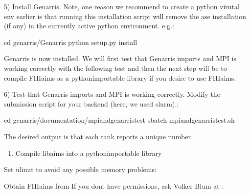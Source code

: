 \documentclass[letterpaper,10pt,english]{sphinxmanual}
\begin{document}
5) Install Genarris. Note, one reason we recommend to create a python virutal env earlier is that running this installation script will remove the ase installation (if any) in the currently active python environment.
e.g.:

\begin{sphinxVerbatim}[commandchars=\\\{\}]
cd \PYGZdl{}genarris/Genarris
python setup.py install
\end{sphinxVerbatim}

Genarris is now installed. We will first test that Genarris imports and MPI is working correctly with the following test and then the next step will be to compile FHI\sphinxhyphen{}aims as a python\sphinxhyphen{}importable library if you desire to use FHI\sphinxhyphen{}aims.

6) Test that Genarris imports and MPI is working correctly.
Modify the submission script for your backend (here, we used slurm).:

\begin{sphinxVerbatim}[commandchars=\\\{\}]
cd \PYGZdl{}genarris/documentation/mpi\PYGZus{}and\PYGZus{}genarris\PYGZus{}test
sbatch mpi\PYGZus{}and\PYGZus{}genarris\PYGZus{}test.sh
\end{sphinxVerbatim}

The desired output is that each rank reports a unique number.
\begin{enumerate}
%
\setcounter{enumi}{6}
\item {} 
Compile libaims into a python\sphinxhyphen{}importable library

\end{enumerate}

Set ulimit to avoid any possible memory problems:

\begin{sphinxVerbatim}[commandchars=\\\{\}]
  
  

 
\end{sphinxVerbatim}

Obtain FHI\sphinxhyphen{}aims from 
If you don\textquotesingle{}t have permissions, ask Volker Blum at :
\end{document}

